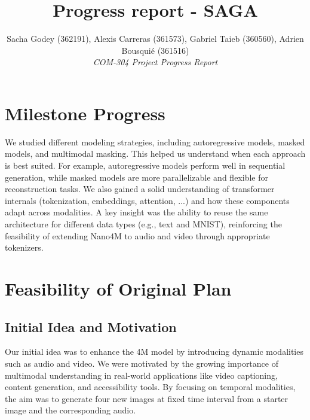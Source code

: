 \documentclass[10pt,conference,compsocconf]{IEEEtran}
\begin{document}
\title{Progress report - SAGA}

\author{
  Sacha Godey (362191), Alexis Carreras (361573), Gabriel Taieb (360560), Adrien Bousquié (361516)\\
  \textit{COM-304 Project Progress Report}
}

\maketitle


\section{Milestone Progress}
We studied different modeling strategies, including autoregressive models, masked models, and multimodal masking. This helped us understand when each approach is best suited. For example, autoregressive models perform well in sequential generation, while masked models are more parallelizable and flexible for reconstruction tasks. We also gained a solid understanding of transformer internals (tokenization, embeddings, attention, ...) and how these components adapt across modalities. A key insight was the ability to reuse the same architecture for different data types (e.g., text and MNIST), reinforcing the feasibility of extending Nano4M to audio and video through appropriate tokenizers.


\section{Feasibility of Original Plan}
\label{sec:feasibility}
\subsection{Initial Idea and Motivation}
Our initial idea was to enhance the 4M model by introducing dynamic modalities such as audio and video. We were motivated by the growing importance of multimodal understanding in real-world applications like video captioning, content generation, and accessibility tools. By focusing on temporal modalities, the aim was to generate four new images at fixed time interval from a starter image and the corresponding audio.
\end{document}
